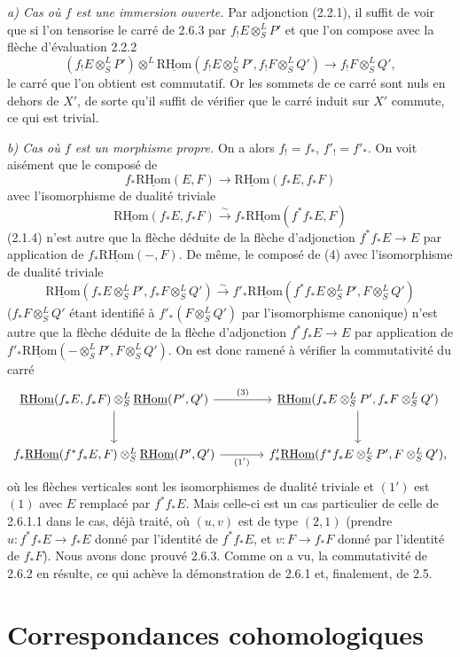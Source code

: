 \documentclass[11pt]{article}
\newcommand{\R}{\mathrm{R}}\newcommand{\RHomCore}{\mathrm{RHom}}
\providecommand{\RHom}{\RHomCore}
\providecommand{\uRHom}{\underline{\RHom}}
\providecommand{\RHom}{\RHomCore}
\providecommand{\RHom}{\R\mathcal{H}om}
\providecommand{\R}{\mathrm R}
\providecommand{\RHom}{\RHomCore}
\begin{document}
\emph{a) Cas où $f$ est une immersion ouverte.} Par adjonction (2.2.1), il suffit de voir que si l'on tensorise le carré de 2.6.3 par $f_!E\otimes^L_SP'$ et que l'on compose avec la flèche d'évaluation 2.2.2
\[
(f_!E\otimes^L_SP')\otimes^L\uRHom(f_!E\otimes^L_SP',f_!F\otimes^L_SQ')\longrightarrow f_!F\otimes^L_SQ',
\]
le carré que l'on obtient est commutatif. Or les sommets de ce carré sont nuls en dehors de $X'$, de sorte qu'il suffit de vérifier que le carré induit sur $X'$ commute, ce qui est trivial.

\emph{b) Cas où $f$ est un morphisme propre.} On a alors $f_!=f_*$, $f'_!=f'_*$. On voit aisément que le composé de
\[
f_*\uRHom(E,F)\longrightarrow\uRHom(f_*E,f_*F)
\]
avec l'isomorphisme de dualité triviale
\[
\uRHom(f_*E,f_*F)\xrightarrow{\sim}f_*\uRHom(f^{*}f_*E,F)
\]
(2.1.4) n'est autre que la flèche déduite de la flèche d'adjonction $f^{*}f_*E\to E$ par application de $f_*\uRHom(-,F)$. De même, le composé de (4) avec l'isomorphisme de dualité triviale
\[
\uRHom(f_*E\otimes^L_SP',f_*F\otimes^L_SQ')\xrightarrow{\sim}f'_*\uRHom(f^{*}f_*E\otimes^L_SP',F\otimes^L_SQ')
\]
($f_*F\otimes^L_SQ'$ étant identifié à $f'_*(F\otimes^L_SQ')$ par l'isomorphisme canonique) n'est autre que la flèche déduite de la flèche d'adjonction $f^{*}f_*E\to E$ par application de $f'_*\uRHom(-\otimes^L_SP',F\otimes^L_SQ')$. On est donc ramené à vérifier la commutativité du carré
\[
\begin{tikzcd}[column sep=large,row sep=large]
\uRHom(f_*E,f_*F)\otimes^L_S\uRHom(P',Q') \arrow[r,"(3)"] \arrow[d] & \uRHom(f_*E\otimes^L_SP',f_*F\otimes^L_SQ') \arrow[d]\\
f_*\uRHom(f^{*}f_*E,F)\otimes^L_S\uRHom(P',Q') \arrow[r,"(1')"'] & f'_*\uRHom(f^{*}f_*E\otimes^L_SP',F\otimes^L_SQ'),
\end{tikzcd}
\]
où les flèches verticales sont les isomorphismes de dualité triviale et $(1')$ est $(1)$ avec $E$ remplacé par $f^{*}f_*E$. Mais celle-ci est un cas particulier de celle de 2.6.1.1 dans le cas, déjà traité, où $(u,v)$ est de type $(2,1)$ (prendre $u:f^{*}f_*E\to f_*E$ donné par l'identité de $f^{*}f_*E$, et $v:F\to f_*F$ donné par l'identité de $f_*F$). Nous avons donc prouvé 2.6.3. Comme on a vu, la commutativité de 2.6.2 en résulte, ce qui achève la démonstration de 2.6.1 et, finalement, de 2.5.

\clearpage
\section{Correspondances cohomologiques}
\end{document}
